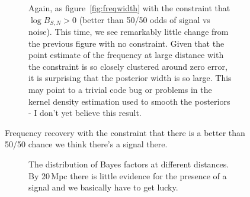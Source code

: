 \documentclass[showpacs, superscriptaddress, showpacs, letterpaper, showkeys,
preprintnumbers, altaffilletter, amssymb, amsmath, amsfonts, prd,
onecolumn, floatfix, nofootinbib]{revtex4-1}
\begin{document}
\begin{figure}
\begin{subfigure}{0.45\textwidth}
\caption{Again, as figure~\ref{fig:freqwidth} with the constraint that $\log
B_{S,N}>0$ (better than 50/50 odds of signal vs noise).  This time, we see
remarkably little change from the previous figure with no constraint.  Given
that the point estimate of the frequency at large distance with the constraint
is so closely clustered around zero error, it is surprising that the posterior
width is so large.  This may point to a trivial code bug or problems in the
kernel density estimation used to smooth the posteriors - I don't yet believe
this result.}
\end{subfigure}
\caption{Frequency recovery with the constraint that there is a better than
50/50 chance we think there's a signal there.\label{fig:constrained_freqrecovery}}
\end{figure}

\begin{figure}
\begin{subfigure}{0.45\textwidth}
{}
\caption{The distribution of Bayes factors at different distances.  By 20\,Mpc
there is little evidence for the presence of a signal and we basically have to
get lucky.~\\~\\~\\~\\~\\~\\}
\end{subfigure}
\begin{subfigure}{0.45\textwidth}

\end{subfigure}
\end{figure}
\end{document}
